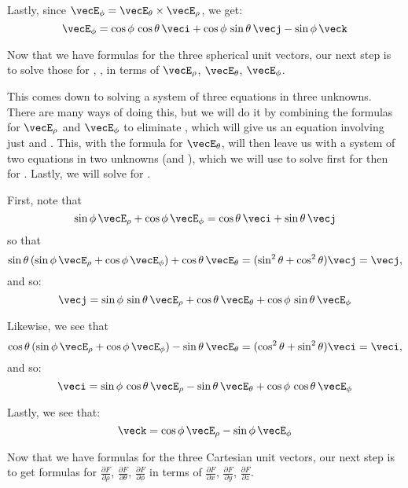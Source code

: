 {Lastly, since $\vecE_{\phi}=\vecE_{\theta}\times\vecE_{\rho}$, we get:
\begin{equation}
 \vecE_{\phi} = \cos\phi\,\cos\theta\,\veci + \cos\phi\,\sin\theta\,\vecj - \sin\phi\,\veck
\end{equation}

Now that we have formulas for the three spherical unit vectors, our next step is to solve those for \veci, \vecj, \veck in terms of $\vecE_{\rho}$, $\vecE_{\theta}$, $\vecE_{\phi}$.

This comes down to solving a system of three equations in three unknowns. There are many ways of doing this, but we will do it by combining the formulas for $\vecE_{\rho}$ and $\vecE_{\phi}$ to eliminate \veck, which will give us an equation involving just \veci and \vecj. This, with the formula for $\vecE_{\theta}$, will then leave us with a system of two equations in two unknowns (\veci and \vecj), which we will use to solve first for \vecj then for \veci. Lastly, we will solve for \veck.

First, note that
\[
 \sin\phi\,\vecE_{\rho} + \cos\phi\,\vecE_{\phi} = \cos\theta\,\veci + \sin\theta\,\vecj
\]
so that
\[
 \sin\theta\,(\sin\phi\,\vecE_{\rho} + \cos\phi\,\vecE_{\phi}) + \cos\theta\,\vecE_{\theta} =
  (\sin^2 \theta + \cos^2 \theta)\vecj = \vecj ,
\]
and so:
\begin{equation}\label{j_sphere}
 \vecj = \sin\phi\,\sin\theta\,\vecE_{\rho} + \cos\theta\,\vecE_{\theta} + \cos\phi\,\sin\theta\,\vecE_{\phi}
\end{equation}

Likewise, we see that
\[
 \cos\theta\,(\sin\phi\,\vecE_{\rho} + \cos\phi\,\vecE_{\phi}) - \sin\theta\,\vecE_{\theta} =
  (\cos^2 \theta + \sin^2 \theta)\veci = \veci ,
\]
and so:
\begin{equation}\label{i_sphere}
 \veci = \sin\phi\,\cos\theta\,\vecE_{\rho} - \sin\theta\,\vecE_{\theta} + \cos\phi\,\cos\theta\,\vecE_{\phi}
\end{equation}

Lastly, we see that:
\begin{equation}\label{k_sphere}
 \veck = \cos\phi\,\vecE_{\rho} - \sin\phi\,\vecE_{\phi}
\end{equation}

Now that we have formulas for the three Cartesian unit vectors, our next step is to get formulas for $\frac{\partial F}{\partial \rho}$, $\frac{\partial F}{\partial \theta}$, $\frac{\partial F}{\partial \phi}$ in terms of $\frac{\partial F}{\partial x}$, $\frac{\partial F}{\partial y}$, $\frac{\partial F}{\partial z}$.

}
